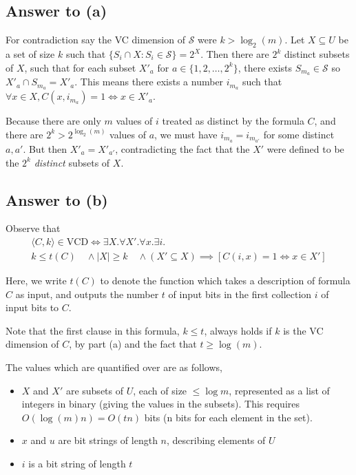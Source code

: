 \documentclass{article}
\begin{document}
\subsection*{Answer to (a)}
For contradiction say the VC dimension of $\mathcal{S}$ were $k > \log_2(m)$.  Let $X \subseteq U$ be a set of size $k$
such that $\{S_i \cap X : S_i \in \mathcal{S}\} = 2^X$.
Then there are $2^k$ distinct subsets of $X$, such that for each subset $X'_a$ for $a \in \{1, 2, \dots, 2^k\}$, there exists $S_{m_a} \in \mathcal{S}$ so $X'_a \cap S_{m_a} = X'_a$.  This means there exists a number $i_{m_a}$ such that $\forall x \in X, C(x, i_{m_a}) = 1 \iff x \in X'_a$.

Because there are only $m$ values of $i$ treated as distinct by the formula $C$, and there are $2^k > 2^{\log_2(m)}$ values of $a$, we must have $i_{m_a} = i_{m_{a'}}$ for some distinct $a, a'$.  But then $X'_a = X'_{a'}$, contradicting the fact that the $X'$ were defined to be the $2^k$ \textit{distinct} subsets of $X$.

\subsection*{Answer to (b)}
Observe that
\begin{multline*}
\langle C, k \rangle \in \text{VCD} \iff
\exists X  .
\forall X' .
\forall x  .
\exists i  . \\
k \leq t(C) \quad \wedge 
|X| \geq k \quad \wedge 
(X' \subseteq X) \implies [C(i, x) = 1 \iff x \in X']
\end{multline*}

Here, we write $t(C)$ to denote the function which takes a description of formula $C$ as input, and outputs the number $t$ of input bits in the first collection $i$ of input bits to $C$.

Note that the first clause in this formula, $k \leq t$, always holds if $k$ is the VC dimension of $C$, by part (a) and the fact that $t \geq \log(m)$.

The values which are quantified over are as follows,
\begin{itemize}
	\item $X$ and $X'$ are subsets of $U$, each of size $\leq \log m$, represented as a list of integers in binary (giving the values in the subsets).  This requires $O(\log(m) n) = O(t n)$ bits (n bits for each element in the set).
	\item $x$ and $u$ are bit strings of length $n$, describing elements of $U$
	\item $i$ is a bit string of length $t$
\end{itemize}
\end{document}
